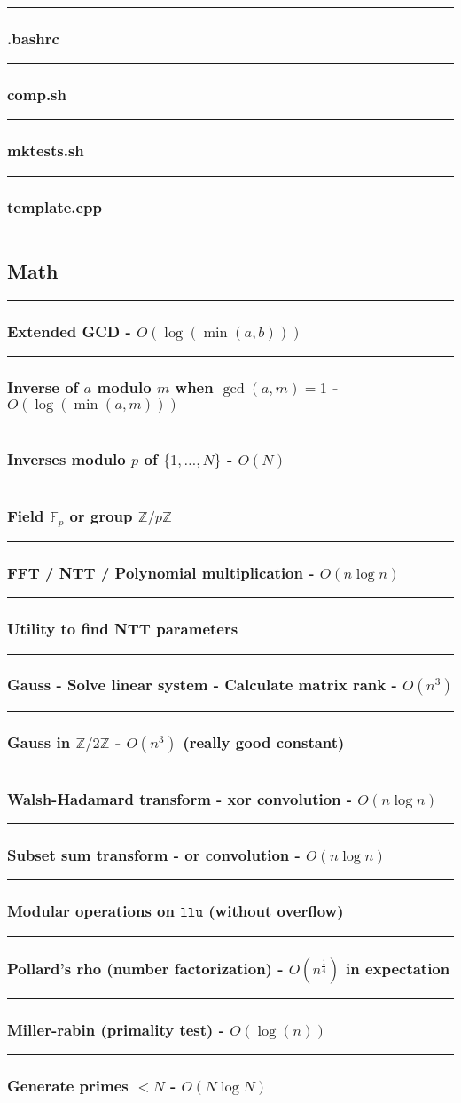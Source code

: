 \documentclass[landscape,a4paper,twocolumn,10pt]{report}
\renewcommand{\line}{\noindent\rule{\linewidth}{1pt}}
\newcommand{\algosection}[1]{\line \subsection*{#1}}
\newcommand{\algorithm}[1]{\line \subsubsection*{#1}}
\begin{document}
\algorithm{.bashrc}


\algorithm{comp.sh}


\algorithm{mktests.sh}


\algorithm{template.cpp}


\algosection{Math}
\label{math}

\algorithm{Extended GCD - $O(\log(\min(a, b)))$}


\algorithm{Inverse of $a$ modulo $m$ when $\operatorname{gcd}(a, m) = 1$ - $O(\log(\min(a, m)))$}


\algorithm{Inverses modulo $p$ of $\{1, \dots, N\}$ - $O(N)$}


\algorithm{Field $\mathbb F_p$ or group $\mathbb Z/p\mathbb Z$}


\algorithm{FFT / NTT / Polynomial multiplication - $O(n \log n)$}


\algorithm{Utility to find NTT parameters}


\algorithm{Gauss - Solve linear system - Calculate matrix rank - $O(n^3)$}


\algorithm{Gauss in $\mathbb Z/2\mathbb Z$ - $O(n^3)$ (really good constant)}


\algorithm{Walsh-Hadamard transform - xor convolution - $O(n \log n)$}


\algorithm{Subset sum transform - or convolution - $O(n \log n)$}


\algorithm{Modular operations on $\texttt{llu}$ (without overflow)}


\algorithm{Pollard's rho (number factorization) - $O(n^{\frac{1}{4}})$ in expectation}


\algorithm{Miller-rabin (primality test) - $O(\log(n))$}


\algorithm{Generate primes $< N$ - $O(N \log N)$}

\end{document}
